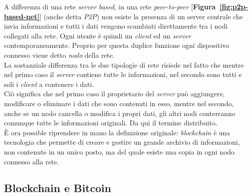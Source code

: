 \documentclass[11pt]{thesistemp}
\begin{document}
A differenza di una rete \textit{server based}, in una rete \textit{peer-to-peer} [\textbf{Figura~\ref{fig:p2p-based-net}}] (anche detta \textit{P2P}) non esiste la presenza di un server centrale che invia informazioni e tutti i dati vengono scambiati direttamente tra i nodi collegati alla rete. Ogni utente è quindi un \textit{client} ed un \textit{server} contemporaneamente.
Proprio per questa duplice funzione ogni dispositivo connesso viene detto \textit{nodo} della rete.\\
La sostanziale differenza tra le due tipologie di rete risiede nel fatto che mentre nel primo caso il \textit{server} contiene tutte le informazioni, nel secondo sono tutti e soli i \textit{client} a contenere i dati.\\
Ciò significa che nel primo caso il proprietario del \textit{server} può aggiungere, modificare o eliminare i dati che sono contenuti in esso, mentre nel secondo, anche se un nodo cancella o modifica i propri dati, gli altri nodi conterranno comunque tutte le informazioni originali. Da qui il termine distribuito.\\
\`E ora possible riprendere in mano la definizione originale: \textit{blockchain} è una tecnologia che permette di creare e gestire un grande archivio di informazioni, non contenute in un unico posto, ma del quale esiste una copia in ogni nodo connesso alla rete.

\subsection{Blockchain e Bitcoin}
\end{document}
